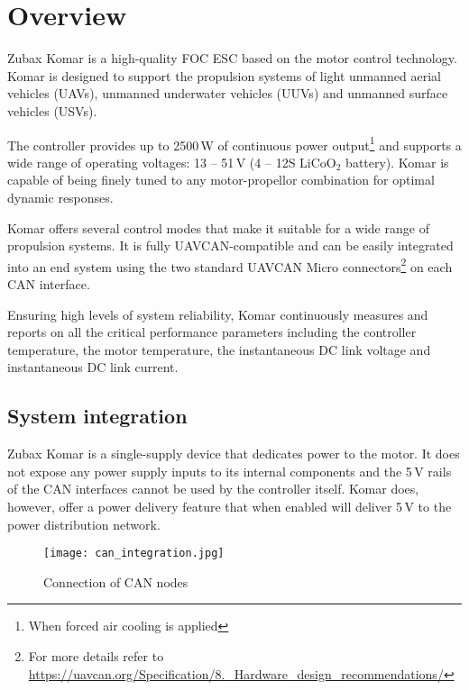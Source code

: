 \chapter{Overview}

Zubax Komar is a high-quality FOC ESC based on the  motor control technology. Komar is designed 
to support the propulsion systems of light unmanned aerial vehicles (UAVs), unmanned underwater vehicles (UUVs) and
unmanned surface vehicles (USVs).

The controller provides up to 2500\,W of continuous power output\footnote{When forced air cooling is applied} and
supports a wide range of operating voltages: 13 -- 51\,V (4 -- 12S $\text{LiCoO}_\text{2}$ battery).
Komar is capable of being finely tuned to any motor-propellor combination for optimal dynamic responses.

Komar offers several control modes that make it suitable for a wide range of propulsion systems.
It is fully UAVCAN-compatible and can be easily integrated into an end system using the two standard UAVCAN
Micro connectors\footnote{For more details refer to
\url{https://uavcan.org/Specification/8._Hardware_design_recommendations/}} on each CAN interface.

Ensuring high levels of system reliability, Komar continuously measures and reports on all the critical
performance parameters including the controller temperature, the motor temperature, the instantaneous
DC link voltage and instantaneous DC link current.

\section{System integration}
Zubax Komar is a single-supply device that dedicates power to the motor. It does not expose any power supply
inputs to its internal components and the 5\,V rails of the CAN interfaces cannot be used by the controller
itself. Komar does, however, offer a power delivery feature that when enabled will deliver 5\,V to the power
distribution network.

\begin{figure}[h]
    \centering
    \texttt{[image: can\_integration.jpg]}
    \caption{Connection of CAN nodes}
\end{figure}
